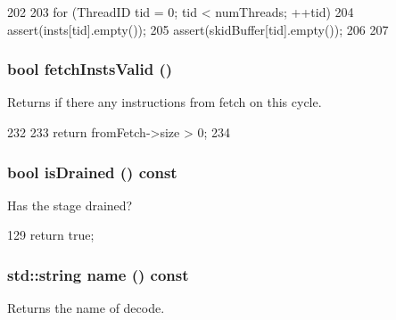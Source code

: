 \begin{DoxyCode}
202 {
203     for (ThreadID tid = 0; tid < numThreads; ++tid) {
204         assert(insts[tid].empty());
205         assert(skidBuffer[tid].empty());
206     }
207 }
\end{DoxyCode}
\hypertarget{classDefaultDecode_a5517058b9f07975a25ecbf123bcc4844}{
\subsubsection[{fetchInstsValid}]{\setlength{\rightskip}{0pt plus 5cm}bool fetchInstsValid ()}}
\label{classDefaultDecode_a5517058b9f07975a25ecbf123bcc4844}
Returns if there any instructions from fetch on this cycle. 


\begin{DoxyCode}
232 {
233     return fromFetch->size > 0;
234 }
\end{DoxyCode}
\hypertarget{classDefaultDecode_adf5473c18a3d7c1e88c4a2072bce5526}{
\subsubsection[{isDrained}]{\setlength{\rightskip}{0pt plus 5cm}bool isDrained () const}}
\label{classDefaultDecode_adf5473c18a3d7c1e88c4a2072bce5526}
Has the stage drained? 


\begin{DoxyCode}
129 { return true; }
\end{DoxyCode}
\hypertarget{classDefaultDecode_a37627d5d5bba7f4a8690c71c2ab3cb07}{
\subsubsection[{name}]{\setlength{\rightskip}{0pt plus 5cm}std::string name () const}}
\label{classDefaultDecode_a37627d5d5bba7f4a8690c71c2ab3cb07}
Returns the name of decode. 


